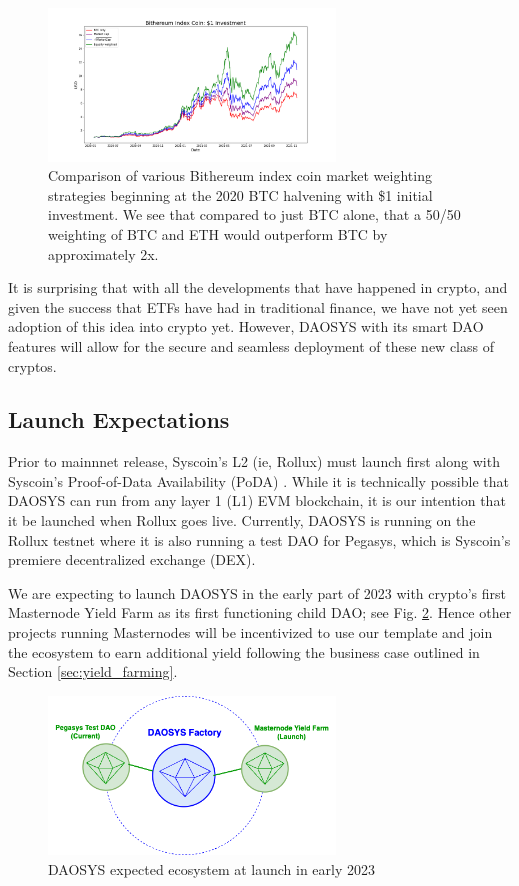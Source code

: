 \documentclass[journal,twocolumn,12pt]{ieeesyscoin}
\begin{document}
\begin{figure}[h!]
\includegraphics[width=3in]{img/index_coin.png}
\caption{Comparison of various Bithereum index coin market weighting strategies beginning at the 2020 BTC halvening with \$1 initial investment. We see that compared to just BTC alone, that a 50/50 weighting of BTC and ETH would outperform BTC by approximately 2x.} 
\label{fig:crypto_index}
\end{figure} 

It is surprising that with all the developments that have happened in crypto, and given the success that ETFs have had in traditional finance, we have not yet seen adoption of this idea into crypto yet. However, DAOSYS with its smart DAO features will allow for the secure and seamless deployment of these new class of cryptos.  

\subsection{Launch Expectations}

Prior to mainnnet release, Syscoin's L2 (ie, Rollux) \cite{ROL22, Sig21a, Sig21b} must launch first along with Syscoin's Proof-of-Data Availability (PoDA) \cite{PODA22}. While it is technically possible that DAOSYS can run from any layer 1 (L1) EVM blockchain, it is our intention that it be launched when Rollux goes live. Currently, DAOSYS is running on the Rollux testnet where it is also running a test DAO for Pegasys, which is Syscoin's premiere decentralized exchange (DEX). 

We are expecting to launch DAOSYS in the early part of 2023 with crypto's first Masternode Yield Farm as its first functioning child DAO; see Fig. \ref{fig:daosys_launch}. Hence other projects running Masternodes will be incentivized to use our template and join the ecosystem to earn additional yield following the business case outlined in Section \ref{sec:yield_farming}.

\begin{figure}[h!]
\includegraphics[width=3in]{img/daosys_launch.png}
\caption{DAOSYS expected ecosystem at launch in early 2023} 
\label{fig:daosys_launch}
\end{figure} 
\end{document}
